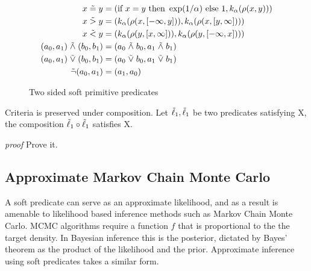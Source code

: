 

\begin{figure}
\begin{align*}
x \mathrel{\tilde{=}} y &= (\text{if } x = y  \text{ then } \exp(1/\alpha) \text{ else } 1, k_\alpha(\rho(x, y)))\\
x \mathrel{\tilde{>}} y &= (k_\alpha(\rho(x, [-\infty, y])), k_\alpha(\rho(x, [y, \infty])))\\
x \mathrel{\tilde{<}} y &= (k_\alpha(\rho(y, [x, \infty])), k_\alpha(\rho(y, [-\infty, x])))\\
(a_0, a_1) \mathrel{\tilde{\land}} (b_0, b_1) &= (a_0 \mathrel{\tilde{\land}} b_0, a_1 \mathrel{\tilde{\land}} b_1)\\
(a_0, a_1) \mathrel{\tilde{\lor}} (b_0, b_1) &= (a_0 \mathrel{\tilde{\lor}} b_0, a_1 \mathrel{\tilde{\lor}} b_1)\\
\tilde{\neg}(a_0, a_1) &= (a_1, a_0)
\end{align*}
\caption{Two sided soft primitive predicates}
\label{softw}
\end{figure}

\begin{theorem}Criteria is preserved under composition.
Let $\tilde{\ell}_1, \tilde{\ell}_1$  be two predicates satisfying X, the composition $\tilde{\ell}_1 \circ \tilde{\ell}_1$ satisfies X.
\end{theorem}
\emph{proof} Prove it.



\subsection{Approximate Markov Chain Monte Carlo}
A soft predicate can serve as an approximate likelihood, and as a result is amenable to likelihood based inference methods such as Markov Chain Monte Carlo.
MCMC algorithms require a function $f$ that is proportional to the the target density.
In Bayesian inference this is the posterior, dictated by Bayes' theorem as the product of the likelihood and the prior.
Approximate inference using soft predicates takes a similar form.

